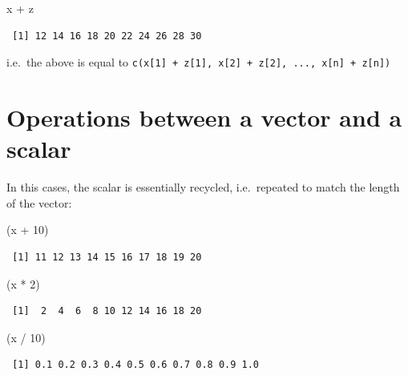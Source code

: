 \documentclass[
]{book}
\newenvironment{Shaded}{\begin{snugshade}}{\end{snugshade}}
\newcommand{\DecValTok}[1]{\textcolor[rgb]{0.00,0.00,0.81}{#1}}
\newcommand{\NormalTok}[1]{#1}
\newcommand{\SpecialCharTok}[1]{\textcolor[rgb]{0.00,0.00,0.00}{#1}}
\begin{document}
\begin{Shaded}
\begin{Highlighting}[]
\NormalTok{x }\SpecialCharTok{+}\NormalTok{ z}
\end{Highlighting}
\end{Shaded}

\begin{verbatim}
 [1] 12 14 16 18 20 22 24 26 28 30
\end{verbatim}

i.e.~the above is equal to \texttt{c(x{[}1{]}\ +\ z{[}1{]},\ x{[}2{]}\ +\ z{[}2{]},\ ...,\ x{[}n{]}\ +\ z{[}n{]})}

\hypertarget{operations-between-a-vector-and-a-scalar}{%
\section{Operations between a vector and a scalar}\label{operations-between-a-vector-and-a-scalar}}

In this cases, the scalar is essentially recycled, i.e.~repeated to match the length of the vector:

\begin{Shaded}
\begin{Highlighting}[]
\NormalTok{(x }\SpecialCharTok{+} \DecValTok{10}\NormalTok{)}
\end{Highlighting}
\end{Shaded}

\begin{verbatim}
 [1] 11 12 13 14 15 16 17 18 19 20
\end{verbatim}

\begin{Shaded}
\begin{Highlighting}[]
\NormalTok{(x }\SpecialCharTok{*} \DecValTok{2}\NormalTok{)}
\end{Highlighting}
\end{Shaded}

\begin{verbatim}
 [1]  2  4  6  8 10 12 14 16 18 20
\end{verbatim}

\begin{Shaded}
\begin{Highlighting}[]
\NormalTok{(x }\SpecialCharTok{/} \DecValTok{10}\NormalTok{)}
\end{Highlighting}
\end{Shaded}

\begin{verbatim}
 [1] 0.1 0.2 0.3 0.4 0.5 0.6 0.7 0.8 0.9 1.0
\end{verbatim}
\end{document}

